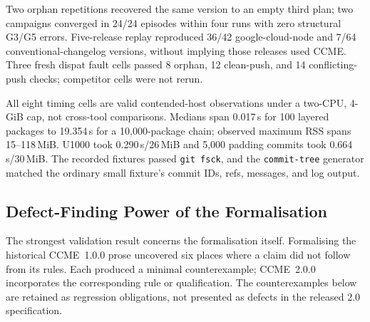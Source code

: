\documentclass[sigconf,nonacm]{acmart}
\newcommand{\code}[1]{\texttt{#1}}
\begin{document}
Two orphan repetitions recovered the same version to an empty third plan;
two campaigns converged in 24/24 episodes within four runs with zero structural
G3/G5 errors. Five-release replay reproduced 36/42 google-cloud-node and 7/64
conventional-changelog versions, without implying those releases used CCME.
Three fresh dispat fault cells passed 8 orphan, 12 clean-push, and 14
conflicting-push checks; competitor cells were not rerun.

All eight timing cells are valid contended-host observations under a two-CPU,
4-GiB cap, not cross-tool comparisons. Medians span 0.017\,s for 100 layered
packages to 19.354\,s for a 10{,}000-package chain; observed maximum RSS spans
15--118\,MiB. U1000 took 0.290\,s/26\,MiB and 5{,}000 padding commits took
0.664\,s/30\,MiB. The recorded fixtures passed \code{git fsck}, and the
\code{commit-tree} generator matched the ordinary small fixture's commit IDs,
refs, messages, and log output.

\subsection{Defect-Finding Power of the Formalisation}
\label{sec:eval:formal}

The strongest validation result concerns the formalisation itself.
Formalising the historical CCME~1.0.0 prose uncovered six places where a
claim did not follow from its rules. Each produced a minimal counterexample;
CCME~2.0.0 incorporates the corresponding rule or qualification. The
counterexamples below are retained as regression obligations, not presented
as defects in the released 2.0 specification.
\end{document}

